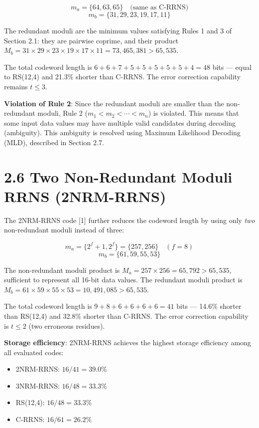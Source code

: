 \documentclass[
  english,
  12pt,
]{report}
\providecommand{\tightlist}{%
  \setlength{\itemsep}{0pt}\setlength{\parskip}{0pt}}
\begin{document}
\[m_a = \{64, 63, 65\} \quad \text{(same as C-RRNS)}\]
\[m_b = \{31, 29, 23, 19, 17, 11\}\]

The redundant moduli are the minimum values satisfying Rules 1 and 3 of
Section 2.1: they are pairwise coprime, and their product
\(M_b = 31 \times 29 \times 23 \times 19 \times 17 \times 11 = 73{,}465{,}381 > 65{,}535\).

The total codeword length is \(6 + 6 + 7 + 5 + 5 + 5 + 5 + 5 + 4 = 48\)
bits --- equal to RS(12,4) and 21.3\% shorter than C-RRNS. The error
correction capability remains \(t \leq 3\).

\textbf{Violation of Rule 2}: Since the redundant moduli are smaller
than the non-redundant moduli, Rule 2 (\(m_1 < m_2 < \cdots < m_n\)) is
violated. This means that some input data values may have multiple valid
candidates during decoding (ambiguity). This ambiguity is resolved using
Maximum Likelihood Decoding (MLD), described in Section 2.7.

\section{2.6 Two Non-Redundant Moduli RRNS
(2NRM-RRNS)}\label{two-non-redundant-moduli-rrns-2nrm-rrns}

The 2NRM-RRNS code {[}1{]} further reduces the codeword length by using
only \emph{two} non-redundant moduli instead of three:

\[m_a = \{2^f + 1, 2^f\} = \{257, 256\} \quad (f = 8)\]
\[m_b = \{61, 59, 55, 53\}\]

The non-redundant moduli product is
\(M_a = 257 \times 256 = 65{,}792 > 65{,}535\), sufficient to represent
all 16-bit data values. The redundant moduli product is
\(M_b = 61 \times 59 \times 55 \times 53 = 10{,}491{,}085 > 65{,}535\).

The total codeword length is \(9 + 8 + 6 + 6 + 6 + 6 = 41\) bits ---
14.6\% shorter than RS(12,4) and 32.8\% shorter than C-RRNS. The error
correction capability is \(t \leq 2\) (two erroneous residues).

\textbf{Storage efficiency}: 2NRM-RRNS achieves the highest storage
efficiency among all evaluated codes:

\begin{itemize}
\tightlist
\item
  2NRM-RRNS: \(16/41 = 39.0\%\)
\item
  3NRM-RRNS: \(16/48 = 33.3\%\)
\item
  RS(12,4): \(16/48 = 33.3\%\)
\item
  C-RRNS: \(16/61 = 26.2\%\)
\end{itemize}
\end{document}
